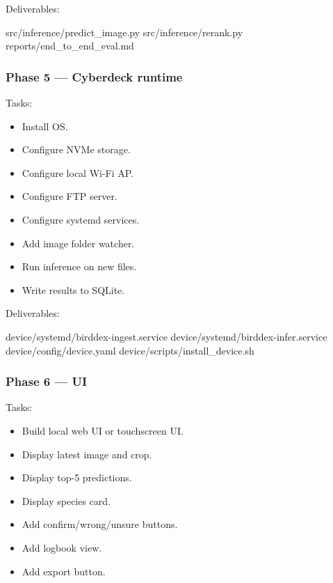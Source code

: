 \documentclass[
  11pt,
]{article}
\newenvironment{Shaded}{}{}
\newcommand{\NormalTok}[1]{#1}
\providecommand{\tightlist}{%
  \setlength{\itemsep}{0pt}\setlength{\parskip}{0pt}}
\begin{document}
Deliverables:

\begin{Shaded}
\begin{Highlighting}[]
\NormalTok{src/inference/predict\_image.py}
\NormalTok{src/inference/rerank.py}
\NormalTok{reports/end\_to\_end\_eval.md}
\end{Highlighting}
\end{Shaded}

\subsubsection{Phase 5 --- Cyberdeck
runtime}\label{phase-5-cyberdeck-runtime}

Tasks:

\begin{itemize}
\tightlist
\item[$\square$]
  Install OS.
\item[$\square$]
  Configure NVMe storage.
\item[$\square$]
  Configure local Wi-Fi AP.
\item[$\square$]
  Configure FTP server.
\item[$\square$]
  Configure systemd services.
\item[$\square$]
  Add image folder watcher.
\item[$\square$]
  Run inference on new files.
\item[$\square$]
  Write results to SQLite.
\end{itemize}

Deliverables:

\begin{Shaded}
\begin{Highlighting}[]
\NormalTok{device/systemd/birddex{-}ingest.service}
\NormalTok{device/systemd/birddex{-}infer.service}
\NormalTok{device/config/device.yaml}
\NormalTok{device/scripts/install\_device.sh}
\end{Highlighting}
\end{Shaded}

\subsubsection{Phase 6 --- UI}\label{phase-6-ui}

Tasks:

\begin{itemize}
\tightlist
\item[$\square$]
  Build local web UI or touchscreen UI.
\item[$\square$]
  Display latest image and crop.
\item[$\square$]
  Display top-5 predictions.
\item[$\square$]
  Display species card.
\item[$\square$]
  Add confirm/wrong/unsure buttons.
\item[$\square$]
  Add logbook view.
\item[$\square$]
  Add export button.
\end{itemize}
\end{document}
